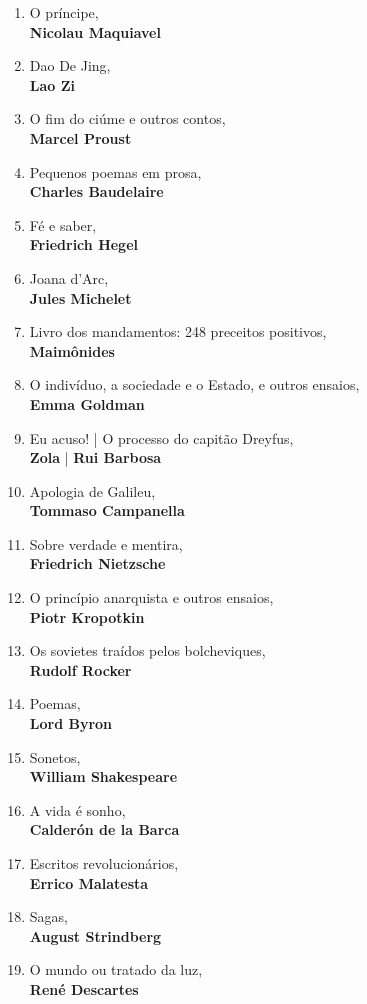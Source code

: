 \begin{enumerate} [font=\Formular\scriptsize]
\item O príncipe,\\ \textbf{Nicolau Maquiavel}
\item Dao De Jing,\\ \textbf{Lao Zi}
\item O fim do ciúme e outros contos,\\ \textbf{Marcel Proust}
\item Pequenos poemas em prosa,\\ \textbf{Charles Baudelaire}
\item Fé e saber,\\ \textbf{Friedrich Hegel}
\item Joana d'Arc,\\ \textbf{Jules Michelet}
\item Livro dos mandamentos: 248 preceitos positivos,\\ \textbf{Maimônides}
\item O indivíduo, a sociedade e o Estado, e outros ensaios,\\ \textbf{Emma Goldman}
\item Eu acuso! | O processo do capitão Dreyfus,\\ \textbf{Zola} | \textbf{Rui Barbosa}
\item Apologia de Galileu,\\ \textbf{Tommaso Campanella}
\item Sobre verdade e mentira,\\ \textbf{Friedrich Nietzsche}
\item O princípio anarquista e outros ensaios,\\ \textbf{Piotr Kropotkin}
\item Os sovietes traídos pelos bolcheviques,\\ \textbf{Rudolf Rocker}
\item Poemas,\\ \textbf{Lord Byron}
\item Sonetos,\\ \textbf{William Shakespeare}
\item A vida é sonho,\\ \textbf{Calderón de la Barca}
\item Escritos revolucionários,\\ \textbf{Errico Malatesta}
\item Sagas,\\ \textbf{August Strindberg}
\item O mundo ou tratado da luz,\\ \textbf{René Descartes}

\end{enumerate}
